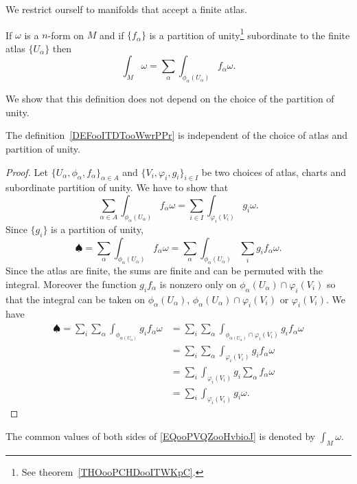 We restrict ourself to manifolds that accept a finite atlas.

\begin{definition}      \label{DEFooITDTooWwrPPr}
    If \( \omega\) is a \( n\)-form on \( M\) and if \( \{ f_{\alpha} \} \) is a partition of unity\footnote{See theorem~\ref{THOooPCHDooITWKpC}.} subordinate to the finite atlas \( \{ U_{\alpha} \}\) then
    \begin{equation}
        \int_M\omega=\sum_{\alpha}\int_{\phi_{\alpha}(U_{\alpha})}f_{\alpha}\omega.
    \end{equation}
\end{definition}

We show that this definition does not depend on the choice of the partition of unity.
\begin{lemma} \label{LEMooCMIZooHhHaHV}
    The definition~\ref{DEFooITDTooWwrPPr} is independent of the choice of atlas and partition of unity.
\end{lemma}

\begin{proof}
    Let \(  \{ U_{\alpha},\phi_{\alpha},f_{\alpha} \}_{\alpha\in A}  \) and \( \{ V_i,\varphi_i,g_i \}_{i\in I}\) be two choices of atlas, charts and subordinate partition of unity. We have to show that
    \begin{equation}        \label{EQooPVQZooHvbioJ}
        \sum_{\alpha\in A}\int_{\phi_{\alpha}(U_{\alpha})}f_{\alpha}\omega=\sum_{i\in I}\int_{\varphi_i(V_i)}g_i\omega.
    \end{equation}
    Since \( \{ g_i \}\) is a partition of unity,
    \begin{equation}
            \spadesuit=\sum_{\alpha}\int_{\phi_{\alpha}(U_{\alpha})}f_{\alpha}\omega=\sum_{\alpha}\int_{\phi_{\alpha}(U_{\alpha})}\sum_ig_if_{\alpha}\omega.
    \end{equation}
    Since the atlas are finite, the sums are finite and can be permuted with the integral. Moreover the function \( g_if_{\alpha}\) is nonzero only on \( \phi_{\alpha}(U_{\alpha})\cap\varphi_i(V_i)\) so that the integral can be taken on \( \phi_{\alpha}(U_{\alpha})\), \( \phi_{\alpha}(U_{\alpha})\cap\varphi_i(V_i)\) or \( \varphi_i(V_i)\). We have
    \begin{subequations}
        \begin{align}
            \spadesuit=\sum_i\sum_{\alpha}\int_{\phi_{\alpha(U_{\alpha})}}g_if_{\alpha}\omega&=  \sum_i\sum_{\alpha}\int_{\phi_{\alpha(U_{\alpha})}\cap \varphi_i(V_i)}g_if_{\alpha}\omega\\
            &=  \sum_i\sum_{\alpha}\int_{\varphi_i(V_i)}g_if_{\alpha}\omega\\
            &= \sum_i\int_{\varphi_i(V_i)}g_i\sum_{\alpha}f_{\alpha}\omega\\
            &=\sum_i\int_{\varphi_i(V_i)}g_i\omega.
        \end{align}
    \end{subequations}
\end{proof}
The common values of both sides of \eqref{EQooPVQZooHvbioJ} is denoted by \( \int_M\omega\).

